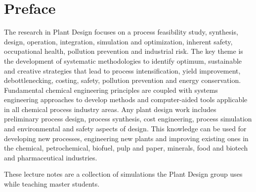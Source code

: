 \chapter*{Preface}

The research in Plant Design focuses on a process feasibility study, synthesis, design, operation, integration, simulation and optimization, inherent safety, occupational health, pollution prevention and industrial risk. The key theme is the development of systematic methodologies to identify optimum, sustainable and creative strategies that lead to process intensification, yield improvement, debottlenecking, costing, safety, pollution prevention and energy conservation. Fundamental chemical engineering principles are coupled with systems engineering approaches to develop methods and computer-aided tools applicable in all chemical process industry areas. Any plant design work includes preliminary process design, process synthesis, cost engineering, process simulation and environmental and safety aspects of design. This knowledge can be used for developing new processes, engineering new plants and improving existing ones in the chemical, petrochemical, biofuel, pulp and paper, minerals, food and biotech and pharmaceutical industries.

These lecture notes are a collection of simulations the Plant Design group uses while teaching master students.

